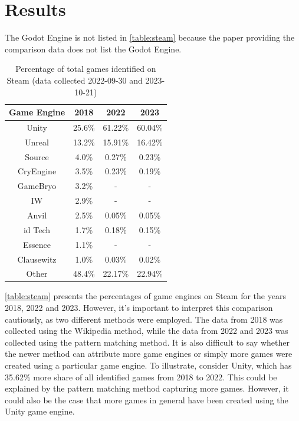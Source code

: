 \section{Results}
The Godot Engine is not listed in \autoref{table:steam} because the paper providing the comparison data does not list the Godot Engine. \\ 

\begin{table}[ht!]
    \centering
    \begin{tabular}{|c c c c|}
        \hline
        Game Engine & 2018   & 2022    & 2023    \\
        \hline\hline
        Unity       & 25.6\% & 61.22\% & 60.04\% \\
        Unreal      & 13.2\% & 15.91\% & 16.42\% \\
        Source      & 4.0\%  & 0.27\%  & 0.23\%  \\
        CryEngine   & 3.5\%  & 0.23\%  & 0.19\%  \\
        GameBryo    & 3.2\%  & -       & -       \\
        IW          & 2.9\%  & -       & -       \\
        Anvil       & 2.5\%  & 0.05\%  & 0.05\%  \\
        id Tech     & 1.7\%  & 0.18\%  & 0.15\%  \\
        Essence     & 1.1\%  & -       & -       \\
        Clausewitz  & 1.0\%  & 0.03\%  & 0.02\%  \\
        Other       & 48.4\% & 22.17\% & 22.94\% \\
        \hline
    \end{tabular}
    \caption{Percentage of total games identified on Steam (data collected 2022-09-30 and 2023-10-21)}
    \label{table:steam}
\end{table}

\autoref{table:steam} presents the percentages of game engines on Steam for the years 2018, 2022 and 2023.
However, it's important to interpret this comparison cautiously, as two different methods were employed.
The data from 2018 was collected using the Wikipedia method, while the data from 2022 and 2023 was collected using the pattern matching method.
It is also difficult to say whether the newer method can attribute more game engines or simply more games were created using a particular game engine.
To illustrate, consider Unity, which has 35.62\% more share of all identified games from 2018 to 2022.
This could be explained by the pattern matching method capturing more games.
However, it could also be the case that more games in general have been created using the Unity game engine.\\

